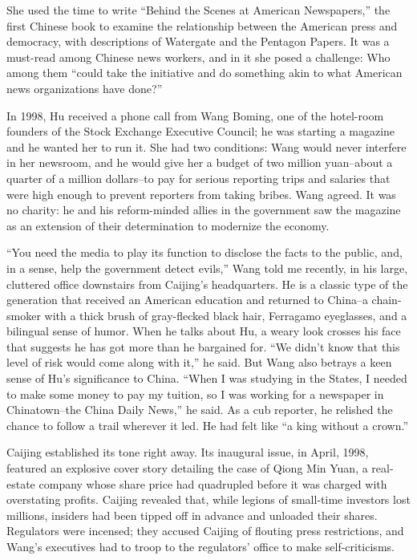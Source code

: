 ﻿\documentclass[12pt]{article}
\begin{document}
She used the time to write ``Behind the Scenes at American Newspapers,'' the first Chinese book to
examine the relationship between the American press and democracy, with descriptions of Watergate
and the Pentagon Papers. It was a must-read among Chinese news workers, and in it she posed a
challenge: Who among them ``could take the initiative and do something akin to what American news
organizations have done?''

In 1998, Hu received a phone call from Wang Boming, one of the hotel-room founders of the Stock
Exchange Executive Council; he was starting a magazine and he wanted her to run it. She had two
conditions: Wang would never interfere in her newsroom, and he would give her a budget of two
million yuan--about a quarter of a million dollars--to pay for serious reporting trips and salaries
that were high enough to prevent reporters from taking bribes. Wang agreed. It was no charity: he
and his reform-minded allies in the government saw the magazine as an extension of their
determination to modernize the economy.

``You need the media to play its function to disclose the facts to the public, and, in a sense, help
the government detect evils,'' Wang told me recently, in his large, cluttered office downstairs from
Caijing's headquarters. He is a classic type of the generation that received an American education
and returned to China--a chain-smoker with a thick brush of gray-flecked black hair, Ferragamo
eyeglasses, and a bilingual sense of humor. When he talks about Hu, a weary look crosses his face
that suggests he has got more than he bargained for. ``We didn't know that this level of risk would
come along with it,'' he said. But Wang also betrays a keen sense of Hu's significance to China.
``When I was studying in the States, I needed to make some money to pay my tuition, so I was working
for a newspaper in Chinatown--the China Daily News,'' he said. As a cub reporter, he relished the
chance to follow a trail wherever it led. He had felt like ``a king without a crown.''

Caijing established its tone right away. Its inaugural issue, in April, 1998, featured an explosive
cover story detailing the case of Qiong Min Yuan, a real-estate company whose share price had
quadrupled before it was charged with overstating profits. Caijing revealed that, while legions of
small-time investors lost millions, insiders had been tipped off in advance and unloaded their
shares. Regulators were incensed; they accused Caijing of flouting press restrictions, and Wang's
executives had to troop to the regulators' office to make self-criticisms.
\end{document}
